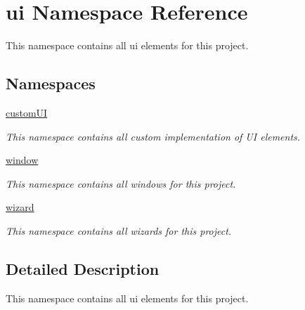 \hypertarget{namespaceui}{}\section{ui Namespace Reference}
\label{namespaceui}


This namespace contains all ui elements for this project.  


\subsection*{Namespaces}
\begin{DoxyCompactItemize}
\item 
 \mbox{\hyperlink{namespaceui_1_1custom_u_i}{custom\+UI}}
\begin{DoxyCompactList}\small\item\em This namespace contains all custom implementation of UI elements. \end{DoxyCompactList}\item 
 \mbox{\hyperlink{namespaceui_1_1window}{window}}
\begin{DoxyCompactList}\small\item\em This namespace contains all windows for this project. \end{DoxyCompactList}\item 
 \mbox{\hyperlink{namespaceui_1_1wizard}{wizard}}
\begin{DoxyCompactList}\small\item\em This namespace contains all wizards for this project. \end{DoxyCompactList}\end{DoxyCompactItemize}


\subsection{Detailed Description}
This namespace contains all ui elements for this project. 